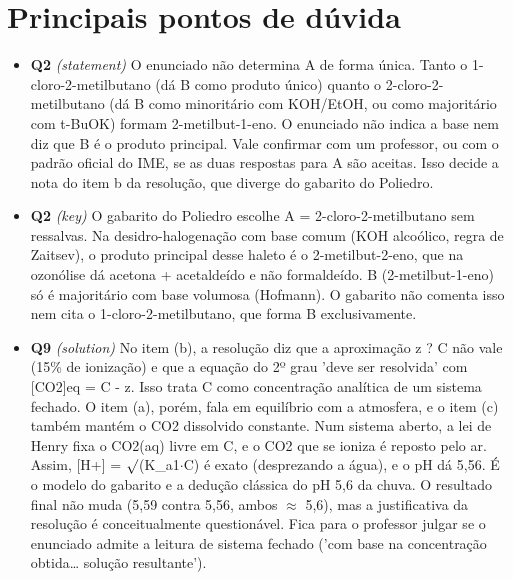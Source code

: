 \documentclass{article}%
\begin{document}
%
\section*{Principais pontos de dúvida}%
\begin{itemize}%
\item%
\textbf{Q2} \textit{(statement)} O enunciado não determina A de forma única. Tanto o 1{-}cloro{-}2{-}metilbutano (dá B como produto único) quanto o 2{-}cloro{-}2{-}metilbutano (dá B como minoritário com KOH/EtOH, ou como majoritário com t{-}BuOK) formam 2{-}metilbut{-}1{-}eno. O enunciado não indica a base nem diz que B é o produto principal. Vale confirmar com um professor, ou com o padrão oficial do IME, se as duas respostas para A são aceitas. Isso decide a nota do item b da resolução, que diverge do gabarito do Poliedro.%
\item%
\textbf{Q2} \textit{(key)} O gabarito do Poliedro escolhe A = 2{-}cloro{-}2{-}metilbutano sem ressalvas. Na desidro{-}halogenação com base comum (KOH alcoólico, regra de Zaitsev), o produto principal desse haleto é o 2{-}metilbut{-}2{-}eno, que na ozonólise dá acetona + acetaldeído e não formaldeído. B (2{-}metilbut{-}1{-}eno) só é majoritário com base volumosa (Hofmann). O gabarito não comenta isso nem cita o 1{-}cloro{-}2{-}metilbutano, que forma B exclusivamente.%
\item%
\textbf{Q9} \textit{(solution)} No item (b), a resolução diz que a aproximação z ? C não vale (15\% de ionização) e que a equação do 2º grau 'deve ser resolvida' com {[}CO2{]}eq = C - z. Isso trata C como concentração analítica de um sistema fechado. O item (a), porém, fala em equilíbrio com a atmosfera, e o item (c) também mantém o CO2 dissolvido constante. Num sistema aberto, a lei de Henry fixa o CO2(aq) livre em C, e o CO2 que se ioniza é reposto pelo ar. Assim, {[}H+{]} = $\surd$(K\_a1$\cdot$C) é exato (desprezando a água), e o pH dá 5,56. É o modelo do gabarito e a dedução clássica do pH 5,6 da chuva. O resultado final não muda (5,59 contra 5,56, ambos $\approx$ 5,6), mas a justificativa da resolução é conceitualmente questionável. Fica para o professor julgar se o enunciado admite a leitura de sistema fechado ('com base na concentração obtida\ldots{} solução resultante').%
\end{itemize}%
\end{document}
